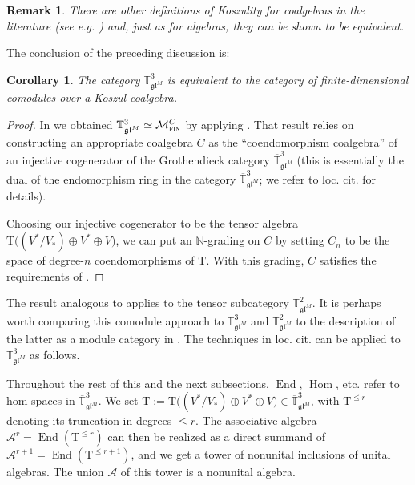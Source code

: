 \documentclass[11pt]{article}
\theoremstyle{plain}
\newtheorem{corollary}[lemma]{Corollary}
\theoremstyle{nonumberplain}
\theoremstyle{plain}
\newtheorem{remark}[lemma]{Remark}
\theoremstyle{nonumberplain}
\newtheorem{proof}{Proof}
\newcommand\bN{{\mathbb N}}
\newcommand\bT{{\mathbb T}}
\newcommand\cA{{\mathcal A}}
\newcommand\cM{{\mathcal M}}
\newcommand\fgl{\mathfrak{gl}}
\newcommand\ol{\overline}
\DeclareMathOperator{\End}{\mathrm{End}}
\DeclareMathOperator{\Hom}{\mathrm{Hom}}
\DeclareMathOperator{\fin}{\cat{fin}}
\newcommand{\cat}[1]{\textsc{#1}}
\begin{document}
\begin{remark}
  There are other definitions of Koszulity for coalgebras in the
  literature (see e.g. \cite[$\S$3.3]{Pos05}) and, just as for algebras, they can be shown to be
  equivalent. 
\end{remark}



The conclusion of the preceding discussion is: 



\begin{corollary}\label{cor.Kosz_better}
  The category $\bT^3_{\fgl^M}$ is equivalent to the category of
  finite-dimensional comodules over a Koszul coalgebra. 
\end{corollary}
\begin{proof}
In  we obtained $\bT^3_{\fgl^M}\simeq \cM^C_{\fin}$ by applying \cite[Theorem 5.1]{Tak77}. That result relies on constructing an appropriate coalgebra $C$ as the ``coendomorphism coalgebra'' of an injective cogenerator of the Grothendieck category $\ol{\bT}^3_{\fgl^M}$ (this is essentially the dual of the endomorphism ring in the category $\ol{\bT}^3_{\fgl^M}$; we refer to loc. cit. for details). 

Choosing our injective cogenerator to be the tensor algebra $\mathrm{T}\big((V^*/V_*)\oplus V^*\oplus V\big)$, we can put an $\bN$-grading on $C$ by setting $C_n$ to be the space of degree-$n$ coendomorphisms of $\mathrm{T}$. With this grading, $C$ satisfies the requirements of . 
\end{proof}




The result analogous to  applies to the tensor subcategory $\bT^2_{\fgl^M}$. It is perhaps worth comparing this comodule approach to $\bT^3_{\fgl^M}$ and $\bT^2_{\fgl^M}$ to the description of the latter as a module category in \cite[$\S$5]{DPS}. The techniques in loc. cit. can be applied to $\bT^3_{\fgl^M}$ as follows. 

Throughout the rest of this and the next subsections, $\End$, $\Hom$, etc. refer to hom-spaces in $\ol{\bT}^3_{\fgl^M}$.   
We set $\mathrm{T}:=\mathrm{T}\big(\left(V^*/V_*\right)\oplus V^*\oplus V\big)\in \ol{\bT}^3_{\fgl^M}$, with $\mathrm{T}^{\le r}$ denoting its truncation in degrees $\le r$. The associative algebra $\cA^r=\End\left(\mathrm{T}^{\le r}\right)$ can then be realized as a direct summand of $\cA^{r+1}=\End\left(\mathrm{T}^{\le{r+1}}\right)$, and we get a tower of nonunital inclusions of unital algebras. The union $\cA$ of this tower is a nonunital algebra. 
\end{document}
